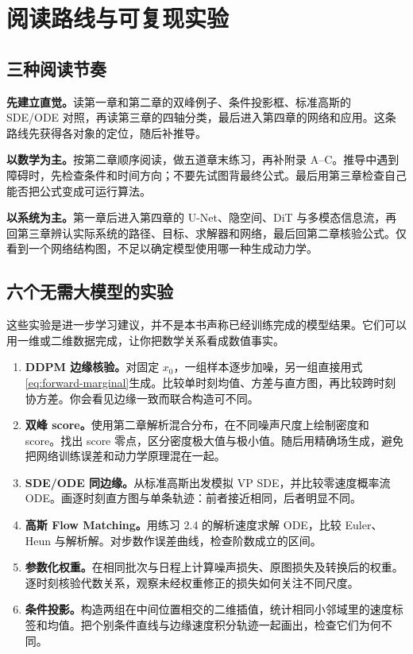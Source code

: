 \chapter{阅读路线与可复现实验}\label{app:exercises}
\section{三种阅读节奏}
\textbf{先建立直觉。}读第一章和第二章的双峰例子、条件投影框、标准高斯的 SDE/ODE 对照，再读第三章的四轴分类，最后进入第四章的网络和应用。这条路线先获得各对象的定位，随后补推导。

\textbf{以数学为主。}按第二章顺序阅读，做五道章末练习，再补附录 A--C。推导中遇到障碍时，先检查条件和时间方向；不要先试图背最终公式。最后用第三章检查自己能否把公式变成可运行算法。

\textbf{以系统为主。}第一章后进入第四章的 U-Net、隐空间、DiT 与多模态信息流，再回第三章辨认实际系统的路径、目标、求解器和网络，最后回第二章核验公式。仅看到一个网络结构图，不足以确定模型使用哪一种生成动力学。

\section{六个无需大模型的实验}
这些实验是进一步学习建议，并不是本书声称已经训练完成的模型结果。它们可以用一维或二维数据完成，让你把数学关系看成数值事实。

\begin{enumerate}
\item \textbf{DDPM 边缘核验。}对固定 $x_0$，一组样本逐步加噪，另一组直接用式\eqref{eq:forward-marginal}生成。比较单时刻均值、方差与直方图，再比较跨时刻协方差。你会看见边缘一致而联合构造可不同。
\item \textbf{双峰 score。}使用第二章解析混合分布，在不同噪声尺度上绘制密度和 score。找出 score 零点，区分密度极大值与极小值。随后用精确场生成，避免把网络训练误差和动力学原理混在一起。
\item \textbf{SDE/ODE 同边缘。}从标准高斯出发模拟 VP SDE，并比较零速度概率流 ODE。画逐时刻直方图与单条轨迹：前者接近相同，后者明显不同。
\item \textbf{高斯 Flow Matching。}用练习 2.4 的解析速度求解 ODE，比较 Euler、Heun 与解析解。对步数作误差曲线，检查阶数成立的区间。
\item \textbf{参数化权重。}在相同批次与日程上计算噪声损失、原图损失及转换后的权重。逐时刻核验代数关系，观察未经权重修正的损失如何关注不同尺度。
\item \textbf{条件投影。}构造两组在中间位置相交的二维插值，统计相同小邻域里的速度标签和均值。把个别条件直线与边缘速度积分轨迹一起画出，检查它们为何不同。
\end{enumerate}

